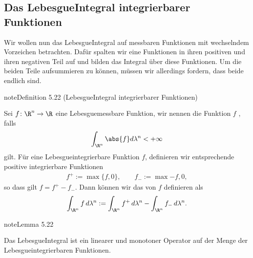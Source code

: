 \documentclass[letterpaper,10pt,german]{jupyterBook}
\begin{document}
\subsection{Das Lebesgue\sphinxhyphen{}Integral integrierbarer Funktionen}
\label{\detokenize{masstheorie/lebesgue_integral:das-lebesgue-integral-integrierbarer-funktionen}}
\sphinxAtStartPar
Wir wollen nun das Lebesgue\sphinxhyphen{}Integral auf messbaren Funktionen mit wechselndem Vorzeichen betrachten. Dafür spalten wir eine Funktionen in ihren positiven und ihren negativen Teil auf und bilden das Integral über diese Funktionen. Um die beiden Teile aufsummieren zu können, müssen wir allerdings fordern, dass beide endlich sind.
\label{masstheorie/lebesgue_integral:definition-16}
\begin{sphinxadmonition}{note}{Definition 5.22 (Lebesgue\sphinxhyphen{}Integral integrierbarer Funktionen)}



\sphinxAtStartPar
Sei \(f \colon \R^n \rightarrow \R\) eine Lebesgue\sphinxhyphen{}messbare Funktion, wir nennen die Funktion \(f\) , falls
\begin{equation*}
\begin{split}\int_{\R^n} \abs{f} d\lambda^n < +\infty\end{split}
\end{equation*}
\sphinxAtStartPar
gilt. Für eine Lebesgue\sphinxhyphen{}integrierbare Funktion \(f\), definieren wir entsprechende positive integrierbare Funktionen
\begin{equation*}
\begin{split}f^+ := \max \lbrace f, 0 \rbrace, \qquad f_- := \max{-f, 0},\end{split}
\end{equation*}
\sphinxAtStartPar
so dass gilt \(f = f^+ - f_-\). Dann können wir das  von \(f\) definieren als
\begin{equation*}
\begin{split}\int_{\R^n} f\, d\lambda^n := \int_{\R^n} f^+\, d\lambda^n - \int_{\R^n} f_-\, d\lambda^n.\end{split}
\end{equation*}\end{sphinxadmonition}
\label{masstheorie/lebesgue_integral:lemma-17}
\begin{sphinxadmonition}{note}{Lemma 5.22}



\sphinxAtStartPar
Das Lebesgue\sphinxhyphen{}Integral ist ein linearer und monotoner Operator auf der Menge der Lebesgue\sphinxhyphen{}integrierbaren Funktionen.
\end{sphinxadmonition}
\end{document}

